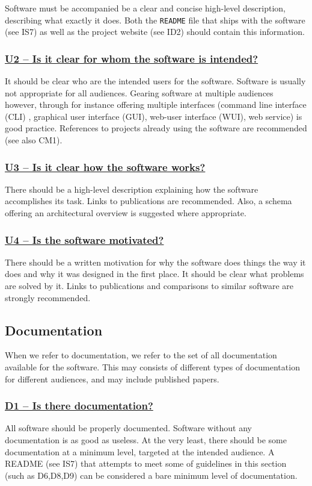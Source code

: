 \documentclass[a4paper,11pt]{article}
\newcommand{\indicator}[1]{\subsubsection*{\underline{#1}}}
\begin{document}
Software must be accompanied be a clear and concise high-level description,
describing what exactly it does. Both the \texttt{README} file that ships with
the software (see IS7) as well as the project website (see ID2) should contain
this information. 

\indicator{U2 -- Is it clear for whom the software is intended?}

It should be clear who are the intended users for the software. Software is
usually not appropriate for all audiences. Gearing software at multiple
audiences however, through for instance offering multiple interfaces (command
line interface (CLI) , graphical user interface (GUI), web-user interface
(WUI), web service) is good practice. References to projects already using the
software are recommended (see also CM1).

\indicator{U3 -- Is it clear how the software works?}

There should be a high-level description explaining how the software
accomplishes its task. Links to publications are recommended. Also, a schema
offering an architectural overview is suggested where appropriate. 

\indicator{U4 -- Is the software motivated?}

There should be a written motivation for why the software does things the way
it does and why it was designed in the first place. It should be clear what
problems are solved by it. Links to publications and comparisons to similar
software are strongly recommended.

\subsection{Documentation}

When we refer to documentation, we refer to the set of all documentation
available for the software. This may consists of different types of
documentation for different audiences, and may include published papers.

\indicator{D1 -- Is there documentation?}

All software should be properly documented. Software without any documentation
is as good as useless. At the very least, there should be some documentation at
a minimum level, targeted at the intended audience. A README (see IS7) that
attempts to meet some of guidelines in this section (such as D6,D8,D9) can be
considered a bare minimum level of documentation.

%
%
%
\end{document}
